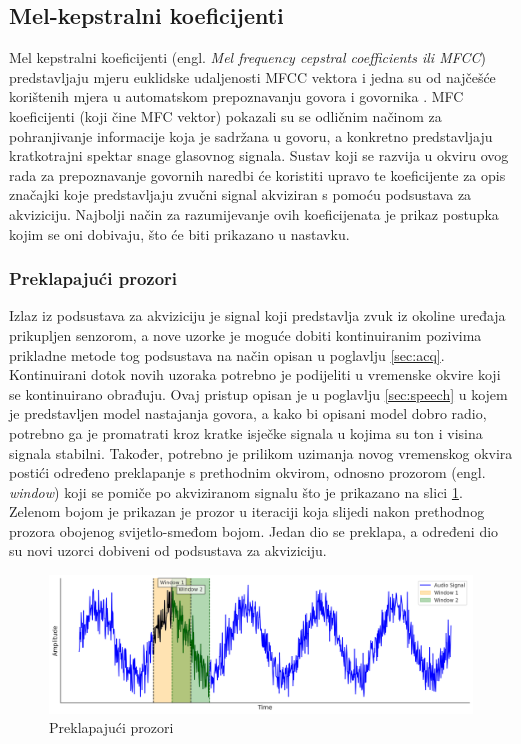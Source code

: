 \subsection{Mel-kepstralni koeficijenti}
\label{MFCCconstruction}
Mel kepstralni koeficijenti (engl. \textit{Mel frequency cepstral coefficients ili MFCC}) predstavljaju mjeru 
euklidske udaljenosti MFCC vektora i jedna su od najčešće korištenih mjera u automatskom 
prepoznavanju govora i govornika \cite{vasilijevic2011perceptual}. 
MFC koeficijenti (koji čine MFC vektor) pokazali su se odličnim načinom za pohranjivanje informacije
koja je sadržana u govoru, a konkretno predstavljaju kratkotrajni spektar snage glasovnog 
signala. Sustav koji se razvija u okviru ovog rada za prepoznavanje govornih naredbi će koristiti upravo te koeficijente za opis
značajki koje predstavljaju zvučni signal akviziran s pomoću podsustava za akviziciju. 
Najbolji način za razumijevanje ovih koeficijenata je prikaz postupka kojim se oni dobivaju, što će biti prikazano u nastavku.


\subsubsection{Preklapajući prozori}
\label{sec:win}
Izlaz iz podsustava za akviziciju je signal koji predstavlja zvuk iz okoline uređaja prikupljen senzorom, 
a nove uzorke je moguće dobiti kontinuiranim pozivima prikladne metode tog podsustava
na način opisan u poglavlju \ref{sec:acq}. Kontinuirani dotok novih uzoraka potrebno 
je podijeliti u vremenske okvire koji se kontinuirano obrađuju. 
Ovaj pristup opisan je u poglavlju \ref{sec:speech} u kojem je predstavljen
model nastajanja govora, a kako bi opisani model dobro radio, potrebno ga je promatrati
kroz kratke isječke signala u kojima su ton i visina signala stabilni. Također, potrebno je prilikom uzimanja novog vremenskog okvira postići određeno preklapanje s prethodnim okvirom, odnosno prozorom (engl. \textit{window})
koji se pomiče po akviziranom signalu što je prikazano na slici \ref{pic:sliding}. Zelenom bojom je prikazan je prozor
u iteraciji koja slijedi nakon prethodnog prozora obojenog svijetlo-smeđom bojom. Jedan dio se preklapa,
a određeni dio su novi uzorci dobiveni od podsustava za akviziciju.

\begin{figure}[htb]
    \centering
    \includegraphics[width=0.9\linewidth]{Chapters/struktura_sustava/generiranje_znacajki/sliding.png} 
    \caption{Preklapajući prozori}
    \label{pic:sliding}
\end{figure}

